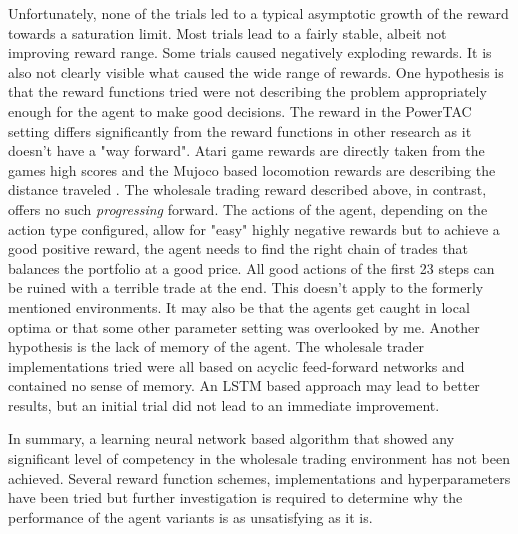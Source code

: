 Unfortunately, none of the trials led to a typical asymptotic growth of the reward towards a saturation limit. Most
trials lead to a fairly stable, albeit not improving reward range. Some trials caused negatively exploding rewards.
It is also not clearly visible what caused the wide range of rewards. One hypothesis is that the reward functions tried
were not describing the problem appropriately enough for the agent to make good decisions. The reward in the
\ac{PowerTAC} setting differs significantly from the reward functions in other research as it doesn't have a "way
forward". Atari game rewards are directly taken from the games high scores and the Mujoco based locomotion rewards are
describing the distance traveled \citep{heess2017emergence}. The wholesale trading reward described above, in contrast, offers no
such \emph{progressing} forward. The actions of the agent, depending on the action type configured, allow for "easy" highly
negative rewards but to achieve a good positive reward, the agent needs to find the right chain of trades that balances
the portfolio at a good price. All good actions of the first 23 steps can be ruined with a terrible trade at the end.
This doesn't apply to the formerly mentioned environments. It may also be that the agents get caught in local optima or that
some other parameter setting was overlooked by me. Another hypothesis is the lack of memory of the agent. The wholesale
trader implementations tried were all based on acyclic feed-forward networks and contained no sense of memory.
An \ac{LSTM} based approach may lead to better results, but an initial trial did not lead to an immediate improvement.

In summary, a learning neural network based algorithm that showed any significant level of
competency in the wholesale trading environment has not been achieved. Several reward function schemes, implementations
and hyperparameters have been tried but further investigation is required to determine why the performance of the agent
variants is as unsatisfying as it is.





